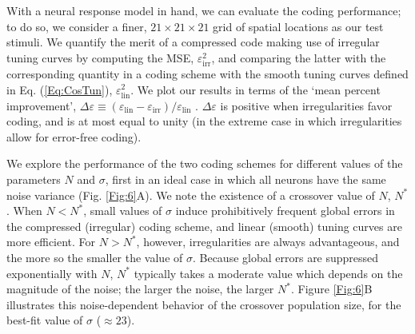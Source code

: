 \documentclass[a4paper]{article}%
\begin{document}
With a neural response model in hand, we can evaluate the coding performance;
to do so, we consider a finer, $21\times21\times21$ grid of spatial locations
as our test stimuli. We quantify the merit of a compressed code making use of
irregular tuning curves by computing the MSE, $\varepsilon_{\text{irr}}^{2}$,
and comparing the latter with the corresponding quantity in a coding scheme
with the smooth tuning curves defined in Eq. (\ref{Eq:CosTun}), $\varepsilon
_{\text{lin}}^{2}$. We plot our results in terms of the `mean percent
improvement', $\Delta\varepsilon\equiv\left(  \varepsilon_{\text{lin}%
}-\varepsilon_{\text{irr}}\right)  /\varepsilon_{\text{lin}}$ . $\Delta
\varepsilon$ is positive when irregularities favor coding, and is at most
equal to unity (in the extreme case in which irregularities allow for
error-free coding).

We explore the performance of the two coding schemes for different values of
the parameters $N$ and $\sigma$, first in an ideal case in which all neurons
have the same noise variance (Fig. \ref{Fig:6}A). We note the existence of a
crossover value of $N$, $N^{\ast}$. When $N<N^{\ast}$, small values of
$\sigma$ induce prohibitively frequent global errors in the compressed
(irregular) coding scheme, and linear (smooth) tuning curves are more
efficient. For $N>N^{\ast}$, however, irregularities are always advantageous,
and the more so the smaller the value of $\sigma$. Because global errors are
suppressed exponentially with $N$, $N^{\ast}$ typically takes a moderate value
which depends on the magnitude of the noise; the larger the noise, the larger
$N^{\ast}$. Figure \ref{Fig:6}B illustrates this noise-dependent behavior of
the crossover population size, for the best-fit value of $\sigma$ ($\approx23$).
\end{document}
